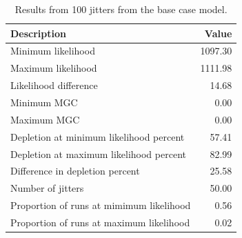 \documentclass[12pt,]{article}
\begin{document}
\begin{table}[ht]
\centering
\caption{Results from 100 jitters from the base 
                                      case model.} 
\label{tab:jitter}
\begin{tabular}{lr}
  \hline
Description & Value \\ 
  \hline
Minimum likelihood & 1097.30 \\ 
  Maximum likelihood & 1111.98 \\ 
  Likelihood difference & 14.68 \\ 
  Minimum MGC & 0.00 \\ 
  Maximum MGC & 0.00 \\ 
  Depletion at minimum likelihood percent & 57.41 \\ 
  Depletion at maximum likelihood percent & 82.99 \\ 
  Difference in depletion percent & 25.58 \\ 
  Number of jitters & 50.00 \\ 
  Proportion of runs at mimimum likelihood & 0.56 \\ 
  Proportion of runs at maximum likelihood & 0.02 \\ 
   \hline
\end{tabular}
\end{table}
\end{document}
